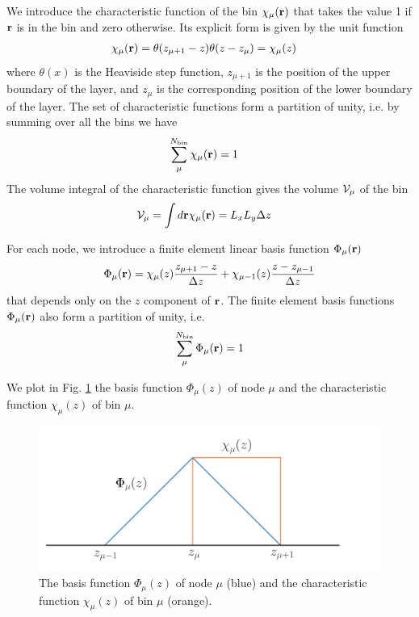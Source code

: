 \documentclass[b5paper,openright,11pt]{book}
\begin{document}
We  introduce the  characteristic function  of the  bin $\chi_\mu({\bf
  r})$ that  takes the value  1 if  ${\bf r}$ is  in the bin  and zero
otherwise.  Its explicit form is given by the unit function
\begin{align}
\chi_\mu({\bf r})&=\theta(z_{\mu+ 1}-z)\theta(z-z_\mu)=\chi_\mu(z)
\label{chi}
\end{align}
where $\theta(x)$ is  the Heaviside step function,  $z_{\mu+1}$ is the
position  of the  upper  boundary of  the layer,  and  $z_\mu$ is  the
corresponding  position  of  the  lower boundary  of  the  layer.   The set of characteristic
functions form  a partition of  unity, i.e.  by summing
over all the bins we have
\begin{align}
  \sum_{\mu}^{N_{\rm bin}}\chi_\mu({\bf r})&=1
\label{PartitionUnity}
\end{align}
The volume  integral of the  characteristic function gives  the volume
${\cal V}_\mu$ of the bin
\begin{align}
{\cal V}_\mu&=  \int d{\bf r}\chi_\mu({\bf r})= L_xL_y\Delta z
\end{align}

For each node, we  introduce  a finite element linear  basis  function
$\Phi_\mu({\bf r})$
\begin{align}
  \Phi_\mu({\bf r})=\chi_\mu(z)\frac{z_{\mu+1}-z}{\Delta z}+\chi_{\mu-1}(z)\frac{z-z_{\mu-1}}{\Delta z}
\end{align}
that depends only on the $z$ component of ${\bf r}$. 
The finite element basis functions $\Phi_\mu({\bf r})$ also form a partition of unity, i.e.
\begin{align}
  \sum_\mu^{N_{\rm bin}}\Phi_\mu({\bf r})=1
\label{partition}
\end{align}

We plot  in Fig.  \ref{psichi} the  basis function  $\Phi_\mu(z)$ of
node  $\mu$ and  the  characteristic function  $\chi_\mu(z)$ of  bin
$\mu$.
\begin{figure}[h]
  \centering
\includegraphics[scale=0.25]{psichi}
\caption{The basis function $\Phi_\mu(z)$ of node $\mu$ (blue) and the characteristic function $\chi_\mu(z)$ of bin $\mu$ (orange).}
\label{psichi}
\end{figure}
\end{document}
